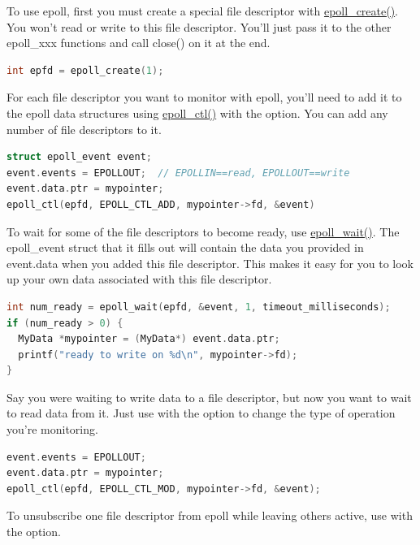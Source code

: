 To use epoll, first you must create a special file descriptor with \href{http://linux.die.net/man/2/epoll_create}{epoll\_create()}.
You won't read or write to this file descriptor.
You'll just pass it to the other epoll\_xxx functions and call close() on it at the end.

\begin{lstlisting}[language=C]
int epfd = epoll_create(1);
\end{lstlisting}

For each file descriptor you want to monitor with epoll, you'll need to add it to the epoll data structures using \href{http://linux.die.net/man/2/epoll_ctl}{epoll\_ctl()} with the  option.
You can add any number of file descriptors to it.

\begin{lstlisting}[language=C]
struct epoll_event event;
event.events = EPOLLOUT;  // EPOLLIN==read, EPOLLOUT==write
event.data.ptr = mypointer;
epoll_ctl(epfd, EPOLL_CTL_ADD, mypointer->fd, &event)
\end{lstlisting}

To wait for some of the file descriptors to become ready, use \href{http://linux.die.net/man/2/epoll_wait}{epoll\_wait()}.
The epoll\_event struct that it fills out will contain the data you provided in event.data when you added this file descriptor.
This makes it easy for you to look up your own data associated with this file descriptor.

\begin{lstlisting}[language=C]
int num_ready = epoll_wait(epfd, &event, 1, timeout_milliseconds);
if (num_ready > 0) {
  MyData *mypointer = (MyData*) event.data.ptr;
  printf("ready to write on %d\n", mypointer->fd);
}
\end{lstlisting}

Say you were waiting to write data to a file descriptor, but now you want to wait to read data from it.
Just use  with the  option to change the type of operation you're monitoring.

\begin{lstlisting}[language=C]
event.events = EPOLLOUT;
event.data.ptr = mypointer;
epoll_ctl(epfd, EPOLL_CTL_MOD, mypointer->fd, &event);
\end{lstlisting}

To unsubscribe one file descriptor from epoll while leaving others active, use  with the  option.

